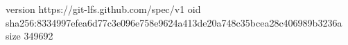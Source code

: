 version https://git-lfs.github.com/spec/v1
oid sha256:8334997efea6d77c3e096e758e9624a413de20a748c35bcea28c406989b3236a
size 349692

